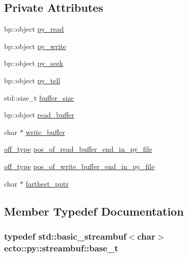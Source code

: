 \subsection*{Private Attributes}
\begin{DoxyCompactItemize}
\item 
bp\+::object \hyperlink{classecto_1_1py_1_1streambuf_a77a192df96e66a2e19cdfce078017df8}{py\+\_\+read}
\item 
bp\+::object \hyperlink{classecto_1_1py_1_1streambuf_aad739c2392d3c8f0de7d44719c7cc37a}{py\+\_\+write}
\item 
bp\+::object \hyperlink{classecto_1_1py_1_1streambuf_ad4e0dc91a74411d2181897d026ff945b}{py\+\_\+seek}
\item 
bp\+::object \hyperlink{classecto_1_1py_1_1streambuf_a3735b9e199be3e58c277354127a86146}{py\+\_\+tell}
\item 
std\+::size\+\_\+t \hyperlink{classecto_1_1py_1_1streambuf_a8d60fa297a9140474d136a48342ac850}{buffer\+\_\+size}
\item 
bp\+::object \hyperlink{classecto_1_1py_1_1streambuf_ac239012691e5d3485572159a53600005}{read\+\_\+buffer}
\item 
char $\ast$ \hyperlink{classecto_1_1py_1_1streambuf_a331e541fac616ac9ac3a81fb117057c6}{write\+\_\+buffer}
\item 
\hyperlink{classecto_1_1py_1_1streambuf_aa01772d1599fc51089a209a69fcab7c7}{off\+\_\+type} \hyperlink{classecto_1_1py_1_1streambuf_a7b219ca66aa176fdfbc9d6fb63d15cef}{pos\+\_\+of\+\_\+read\+\_\+buffer\+\_\+end\+\_\+in\+\_\+py\+\_\+file}
\item 
\hyperlink{classecto_1_1py_1_1streambuf_aa01772d1599fc51089a209a69fcab7c7}{off\+\_\+type} \hyperlink{classecto_1_1py_1_1streambuf_a1775b9bced7a5ff74fe30c788e20ad9e}{pos\+\_\+of\+\_\+write\+\_\+buffer\+\_\+end\+\_\+in\+\_\+py\+\_\+file}
\item 
char $\ast$ \hyperlink{classecto_1_1py_1_1streambuf_a8267e360cfb0201b1518a0dfd3d7c353}{farthest\+\_\+pptr}
\end{DoxyCompactItemize}


\subsection{Member Typedef Documentation}
\subsubsection[{\texorpdfstring{base\+\_\+t}{base_t}}]{\setlength{\rightskip}{0pt plus 5cm}typedef std\+::basic\+\_\+streambuf$<$char$>$ {\bf ecto\+::py\+::streambuf\+::base\+\_\+t}\hspace{0.3cm}{\ttfamily [private]}}\hypertarget{classecto_1_1py_1_1streambuf_ac46c69e7d213fec69f80d1943389366c}{}\label{classecto_1_1py_1_1streambuf_ac46c69e7d213fec69f80d1943389366c}
